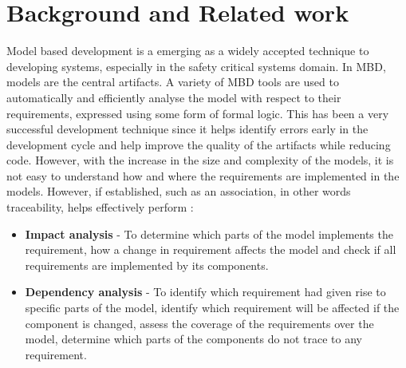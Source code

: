 \section{Background and Related work}
Model based development is a emerging as a widely accepted technique to developing systems, especially in the safety critical systems domain. In MBD, models are the central artifacts. A variety of MBD tools are used to automatically and efficiently analyse the model with respect to their requirements, expressed using some form of formal logic. This has been a very successful development technique since it helps identify errors early in the development cycle and help improve the quality of the artifacts while reducing code. However, with the increase in the size and complexity of the models, it is not easy to understand how and where the requirements are implemented in the models. However, if established, such as an association, in other words traceability, helps effectively perform :
\begin{itemize}
  \item \textbf{Impact analysis} - To determine which parts of the model implements the requirement, how a change in requirement affects the model and check if all requirements are implemented by its components.
  \item \textbf{Dependency analysis} -  To identify which requirement had given rise to specific parts of the model, identify which requirement will be affected if the component is changed, assess the coverage of the requirements over the model, determine which parts of the components do not trace to any requirement.
\end{itemize}

